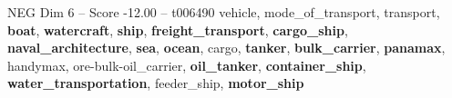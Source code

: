 \begin{textsample}{NEG Dim 6 – Score -12.00 – t006490}  \label{ex:f6_neg_007}
vehicle, mode\_of\_transport, transport, \textbf{boat}, \textbf{watercraft}, \textbf{ship}, \textbf{freight\_transport}, \textbf{cargo\_ship}, \textbf{naval\_architecture}, \textbf{sea}, \textbf{ocean}, cargo, \textbf{tanker}, \textbf{bulk\_carrier}, \textbf{panamax}, handymax, ore-bulk-oil\_carrier, \textbf{oil\_tanker}, \textbf{container\_ship}, \textbf{water\_transportation}, feeder\_ship, \textbf{motor\_ship}

\end{textsample}
